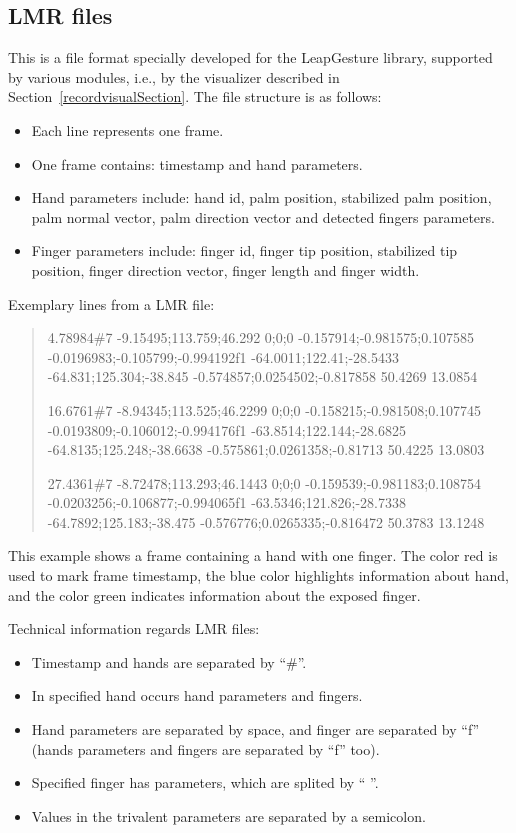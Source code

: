 \subsection{LMR files}\label{lmrFilesSection}
This is a file format specially developed for the LeapGesture library, supported by various modules, i.e., by the visualizer described in Section~\ref{recordvisualSection}. The file structure is as follows:
\begin{itemize}
\item Each line represents one frame.
\item One frame contains: timestamp and hand parameters.
\item Hand parameters include: hand id, palm position, stabilized palm position, palm normal vector, palm direction vector and detected fingers parameters.
\item Finger parameters include: finger id, finger tip position, stabilized tip position, finger direction vector, finger length and finger width.
\end{itemize}

Exemplary lines from a LMR file:
\begin{quote}
{\color{red}4.78984}\#{\color{blue}7 -9.15495;113.759;46.292 0;0;0 -0.157914;-0.981575;0.107585 -0.0196983;-0.105799;-0.994192}f1 {\color{green} -64.0011;122.41;-28.5433 -64.831;125.304;-38.845 -0.574857;0.0254502;-0.817858 50.4269 13.0854}

{\color{red}16.6761}\#{\color{blue}7 -8.94345;113.525;46.2299 0;0;0 -0.158215;-0.981508;0.107745 -0.0193809;-0.106012;-0.994176}f1 {\color{green} -63.8514;122.144;-28.6825 -64.8135;125.248;-38.6638 -0.575861;0.0261358;-0.81713 50.4225 13.0803}

{\color{red}27.4361}\#{\color{blue}7 -8.72478;113.293;46.1443 0;0;0 -0.159539;-0.981183;0.108754 -0.0203256;-0.106877;-0.994065}f1 {\color{green} -63.5346;121.826;-28.7338 -64.7892;125.183;-38.475 -0.576776;0.0265335;-0.816472 50.3783 13.1248}
\end{quote}

This example shows a frame containing a hand with one finger. The color red is used to mark frame timestamp, the blue color
highlights information about hand, and the color green indicates information about the exposed finger.


Technical information regards LMR files:
\begin{itemize}
\item Timestamp and hands are separated by ``\#''.
\item In specified hand occurs hand parameters and fingers.
\item Hand parameters are separated by space, and finger are separated by ``f'' (hands parameters and fingers are separated by ``f'' too).
\item Specified finger has parameters, which are splited by `` ''.
\item Values in the trivalent parameters are separated by a semicolon.
\end{itemize}

